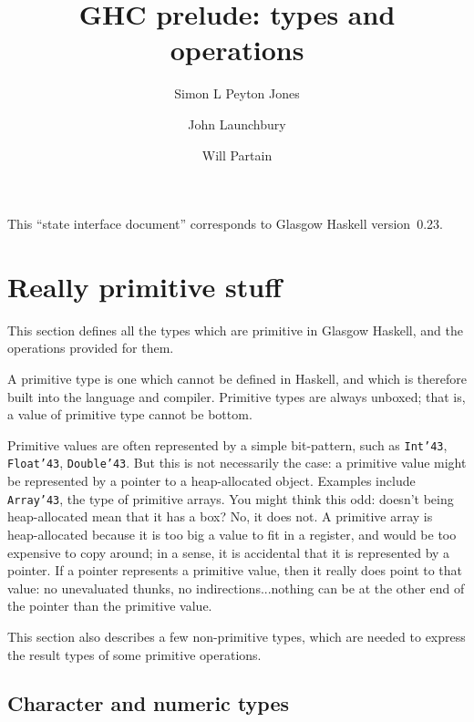 \renewcommand{\textfraction}{0.1}
\renewcommand{\floatpagefraction}{0.9}
\renewcommand{\dblfloatpagefraction}{0.9}

\sloppy




\title{GHC prelude: types and operations}
\author{Simon L Peyton Jones \and John Launchbury \and Will Partain}

\maketitle
\tableofcontents

This ``state interface document'' corresponds to Glasgow Haskell
version~0.23.

\section{Really primitive stuff}

This section defines all the types which are primitive in Glasgow Haskell, and the
operations provided for them.

A primitive type is one which cannot be defined in Haskell, and which is 
therefore built into the language and compiler.
Primitive types are always unboxed; that is, a value of primitive type cannot be 
bottom.

Primitive values are often represented by a simple bit-pattern, such as \mbox{\tt Int{\char'43}}, 
\mbox{\tt Float{\char'43}}, \mbox{\tt Double{\char'43}}.  But this is not necessarily the case: a primitive value 
might be represented by a pointer to a heap-allocated object.  Examples include 
\mbox{\tt Array{\char'43}}, the type of primitive arrays.  You might think this odd: doesn't being 
heap-allocated mean that it has a box?  No, it does not.  A primitive array is 
heap-allocated because it is too big a value to fit in a register, and would be 
too expensive to copy around; in a sense, it is accidental that it is represented 
by a pointer.  If a pointer represents a primitive value, then it really does 
point to that value: no unevaluated thunks, no indirections...nothing can be at 
the other end of the pointer than the primitive value.

This section also describes a few non-primitive types, which are needed 
to express the result types of some primitive operations.

\subsection{Character and numeric types}

